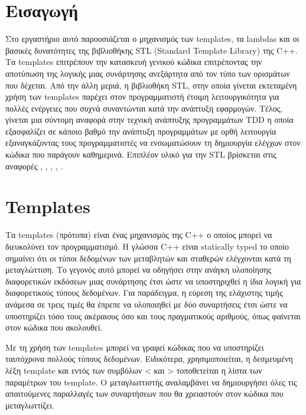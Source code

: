 \section{Εισαγωγή}
Στο εργαστήριο αυτό παρουσιάζεται ο μηχανισμός των templates, τα lambdas και οι βασικές δυνατότητες της βιβλιοθήκης STL (Standard Template Library) της C++. Τα templates επιτρέπουν την κατασκευή γενικού κώδικα επιτρέποντας την αποτύπωση της λογικής μιας συνάρτησης ανεξάρτητα από τον τύπο των ορισμάτων που δέχεται. Από την άλλη μεριά, η βιβλιοθήκη STL, στην οποία γίνεται εκτεταμένη χρήση των templates παρέχει στον προγραμματιστή έτοιμη λειτουργικότητα για πολλές ενέργειες που συχνά συναντώνται κατά την ανάπτυξη εφαρμογών. Τέλος, γίνεται μια σύντομη αναφορά στην τεχνική ανάπτυξης προγραμμάτων TDD η οποία εξασφαλίζει σε κάποιο βαθμό την ανάπτυξη προγραμμάτων με ορθή λειτουργία εξαναγκάζοντας τους προγραμματιστές να ενσωματώσουν τη δημιουργία ελέγχων στον κώδικα που παράγουν καθημερινά. Επιπλέον υλικό για την STL βρίσκεται στις αναφορές \cite{stamatiadis2017}, \cite{geeks4geeks_stl}, \cite{topcoder_stl1}, \cite{topcoder_stl2}, \cite{hackerearth_stl}. 


\section{Templates}
Τα templates (πρότυπα) είναι ένας μηχανισμός της C++ ο οποίος μπορεί να διευκολύνει τον προγραμματισμό. Η γλώσσα C++ είναι statically typed το οποίο σημαίνει ότι οι τύποι δεδομένων των μεταβλητών και σταθερών ελέγχονται κατά τη μεταγλώττιση. Το γεγονός αυτό μπορεί να οδηγήσει στην ανάγκη υλοποίησης διαφορετικών εκδόσεων μιας συνάρτησης έτσι ώστε να υποστηριχθεί η ίδια λογική για διαφορετικούς τύπους δεδομένων. Για παράδειγμα, η εύρεση της ελάχιστης τιμής ανάμεσα σε τρεις τιμές θα έπρεπε να υλοποιηθεί με δύο συναρτήσεις έτσι ώστε να υποστηρίζει τόσο τους ακέραιους όσο και τους πραγματικούς αριθμούς, όπως φαίνεται στον κώδικα που ακολουθεί.





Με τη χρήση των templates μπορεί να γραφεί κώδικας που να υποστηρίζει ταυτόχρονα πολλούς τύπους δεδομένων.  Ειδικότερα, χρησιμοποιείται, η δεσμευμένη λέξη template και εντός των συμβόλων < και > τοποθετείται η λίστα των παραμέτρων του template. Ο μεταγλωττιστής αναλαμβάνει να δημιουργήσει όλες τις απαιτούμενες παραλλαγές των συναρτήσεων που θα χρειαστούν στον κώδικα που μεταγλωττίζει.

